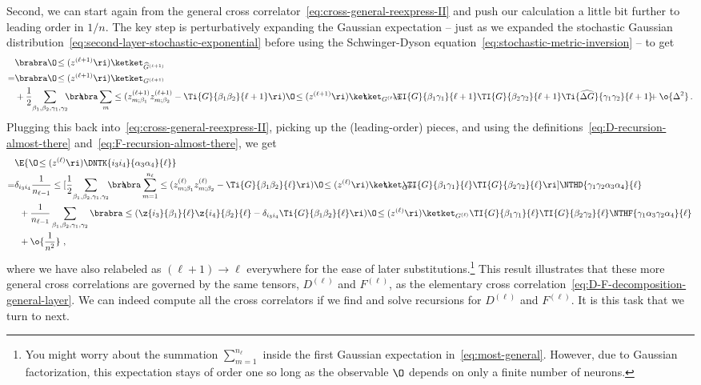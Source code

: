 Second, we can start again from the general cross correlator~\eqref{eq:cross-general-reexpress-II} and push our calculation a little bit further to leading order in $1/n$.
The key step is perturbatively expanding the Gaussian expectation -- just as we expanded the stochastic Gaussian distribution~\eqref{eq:second-layer-stochastic-exponential} before using the Schwinger-Dyson equation~\eqref{eq:stochastic-metric-inversion} -- to get
\begin{align}\label{eq:SD-again}
&\brabra\O\!\le(z^{(\ell+1)}\ri)\ketket_{\widehat{G}^{(\ell+1)}}\, \\
=&\brabra\O\!\le(z^{(\ell+1)}\ri)\ketket_{G^{(\ell+1)}}\, \notag\\
&+\frac{1}{2}\!\sum_{\beta_1,\beta_2,\gamma_1,\gamma_2}\!\!\!\bra\!\!\!\bra\sum_{m}\le(z_{m;\beta_1}^{(\ell+1)}z_{m;\beta_2}^{(\ell+1)}-\Ti{G}{\beta_1\beta_2}{\ell+1}\ri)\O\!\le(z^{(\ell+1)}\ri)\ket\!\!\!\ket_{G^{(\ell+1)}}\!\!\!\!\!\!\!\TI{G}{\beta_1\gamma_1}{\ell+1}\TI{G}{\beta_2\gamma_2}{\ell+1}\Ti{\widehat{\Delta G}}{\gamma_1 \gamma_2}{\ell+1}\!\!\!+\o{\Delta^2}\, .\notag
\end{align}
Plugging this back into~\eqref{eq:cross-general-reexpress-II}, picking up the (leading-order) pieces, and using the definitions~\eqref{eq:D-recursion-almost-there} and~\eqref{eq:F-recursion-almost-there}, we get
\begin{align}\label{eq:most-general}
&\E{\O\!\le(z^{(\ell)}\ri)\DNTK{i_3i_4}{\alpha_3\alpha_4}{\ell}}\, \\
=&\delta_{i_3i_4}\frac{1}{n_{\ell-1}}\le[\frac{1}{2}\!\sum_{\beta_1,\beta_2,\gamma_1,\gamma_2}\!\!\bra\!\!\!\bra\sum_{m=1}^{n_{\ell}}\le(z_{m;\beta_1}^{(\ell)}z_{m;\beta_2}^{(\ell)}-\Ti{G}{\beta_1\beta_2}{\ell}\ri)\O\!\le(z^{(\ell)}\ri)\ket\!\!\!\ket_{G^{(\ell)}}\!\!\!\!\!\!\!\!\!\TI{G}{\beta_1\gamma_1}{\ell}\TI{G}{\beta_2\gamma_2}{\ell}\ri]\NTHD{\gamma_1\gamma_2\alpha_3\alpha_4}{\ell}\, \notag\\
&\,\,\,+\frac{1}{n_{\ell-1}}\sum_{\beta_1,\beta_2,\gamma_1,\gamma_2}\brabra\le(\z{i_3}{\beta_1}{\ell}\z{i_4}{\beta_2}{\ell}-\delta_{i_3i_4}\Ti{G}{\beta_1\beta_2}{\ell}\ri)\O\!\le(z^{(\ell)}\ri)\ketket_{G^{(\ell)}}\TI{G}{\beta_1\gamma_1}{\ell}\TI{G}{\beta_2\gamma_2}{\ell}\NTHF{\gamma_1\alpha_3\gamma_2\alpha_4}{\ell}\, \notag\\
&\,\,\,+\o{\frac{1}{n^2}}\, \, ,\nonumber
\end{align}
where we have also relabeled  as $(\ell+1)\to\ell$ everywhere for the ease of later substitutions.\footnote{You might worry about the summation $\sum_{m=1}^{n_{\ell}}$ inside the first Gaussian expectation in~\eqref{eq:most-general}. However, due to Gaussian factorization, this  expectation stays of order one so long as the observable $\O$ depends on only a finite number of neurons.}
This result illustrates that these more general cross correlations
are governed by the same tensors, $D^{(\ell)}$ and $F^{(\ell)}$, as the elementary cross correlation~\eqref{eq:D-F-decomposition-general-layer}.
We can indeed compute all the cross correlators
if we find and solve recursions for $D^{(\ell)}$ and $F^{(\ell)}$. %
It is this task that we turn to next.





